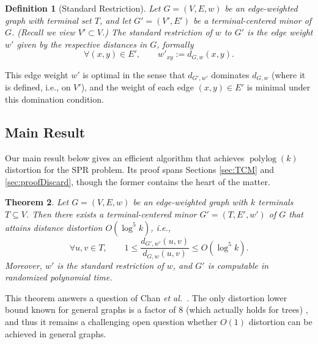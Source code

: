 \documentclass[twoside,leqno,twocolumn]{article}
\newtheorem{definition}[Definition]{Definition}
\newtheorem{theorem}{Theorem}[section]
\newtheorem{definition}[theorem]{Definition}
\DeclareMathOperator{\polylog}{polylog}
\newcommand{\etal}{{\em et al.\ }\xspace}
\providecommand{\eqdef}{:=}
\begin{document}
\begin{definition}[Standard Restriction] \label{defn:sr}
Let $G=(V,E,w)$ be an edge-weighted graph with terminal set $T$,
and let $G'=(V',E')$ be a terminal-centered minor of $G$.
(Recall we view $V'\subset V$.)
The {\em standard restriction} of $w$ to $G'$ is the edge weight $w'$
given by the respective distances in $G$, formally
$$\forall(x,y)\in E',\qquad w'_{xy}\eqdef d_{G,w}(x,y).$$
\end{definition}

This edge weight $w'$ is optimal in the sense that 
$d_{G',w'}$ dominates $d_{G,w}$ (where it is defined, i.e., on $V'$),
and the weight of each edge $(x,y)\in E'$ is minimal
under this domination condition.

\subsection{Main Result} \label{sec:results}

Our main result below gives an efficient algorithm 
that achieves $\polylog(k)$ distortion for the SPR problem.
Its proof spans Sections \ref{sec:TCM} and \ref{sec:proofDiscard},
though the former contains the heart of the matter.

\begin{theorem} \label{thm:main}
Let $G=(V,E,w)$ be an edge-weighted graph with $k$ terminals $T\subseteq V$.
Then there exists a terminal-centered minor $G'=(T,E',w')$ of $G$ that attains distance distortion $O(\log^5 k)$, i.e., 
$$
  \forall u,v \in T,\qquad
  1 \le \frac{d_{G',w'}(u,v)}{d_{G,w}(u,v)}  \le O(\log^5 k).
$$
Moreover, $w'$ is the standard restriction of $w$,
and $G'$ is computable in randomized polynomial time.
\end{theorem}

This theorem answers a question of Chan \etal \cite{CXKR06}. The only distortion lower bound known for general graphs 
is a factor of $8$ (which actually holds for trees) \cite{CXKR06},
and thus it remains a challenging open question whether 
$O(1)$ distortion can be achieved in general graphs.
\end{document}
